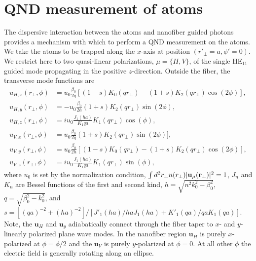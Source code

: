 \documentclass[preprint,aps,pra,onecolumn]{revtex4-1} %
\begin{document}
\section{QND measurement of atoms}
The dispersive interaction between the atoms and nanofiber guided photons provides a mechanism with which to perform a QND measurement on the atoms.  We take the atoms to be trapped along the $x$-axis at position $(r'_\perp =a, \phi' =0)$.  We restrict here to two quasi-linear polarizations, $\mu =\{H,V\}$, of the single HE$_{11}$ guided mode propagating in the positive $z$-direction.  Outside the fiber, the transverse mode functions are~\cite{?}
\begin{align}
u_{H,x}(r_\perp,\phi) &= u_0 \frac{\beta_0}{2 q}[(1-s)K_0(q r_\perp) - (1+s)K_2(q r_\perp) \cos(2 \phi)], \\
u_{H,y}(r_\perp,\phi) &=-u_0 \frac{\beta_0}{2 h}  (1+s)K_2(q r_\perp) \sin(2 \phi) ,\\
u_{H,z}(r_\perp,\phi) &=iu_0 \frac{J_1(ha)}{K_1{qa}} K_1(q r_\perp) \cos(\phi), \\
u_{V,x}(r_\perp,\phi) &= u_0 \frac{\beta_0}{2 q}(1+s)K_2(q r_\perp) \sin(2 \phi)] ,\\
u_{V,y}(r_\perp,\phi) &=u_0 \frac{\beta_0}{2 h} [(1-s)K_0(q r_\perp) - (1+s)K_2(q r_\perp) \cos(2 \phi)], \\
u_{V,z}(r_\perp,\phi) &=iu_0 \frac{J_1(ha)}{K_1{qa}}K_1(q r_\perp) \sin(\phi), 
\end{align}
where $u_0$ is set by the normalization condition, $\int d^2 r_\perp n(r_\perp) | \mathbf{u}_\mu(\mathbf{r}_\perp)|^2=1$, $J_n$ and $K_n$ are Bessel functions of the first and second kind, $h=\sqrt{n^2 k_0^2 - \beta_0^2}$, $q=\sqrt{\beta_0^2- k_0^2}$, and $s = [(q a)^{-2} + (h a)^{-2}]/[J'_1(ha)/haJ_1(ha) + K'_1(qa)/qaK_1(qa)]$.  Note, the $\mathbf{u}_H$ and $\mathbf{u}_y$ adiabatically connect through the fiber taper to $x$- and $y$-linearly polarized plane wave modes.  In the nanofiber region $\mathbf{u}_H$ is purely $x$-polarized at $\phi = \phi/2$ and the  $\mathbf{u}_V$ is purely $y$-polarized at $\phi = 0$.  At all other $\phi$ the electric field is generally rotating along an ellipse.  
\end{document}
